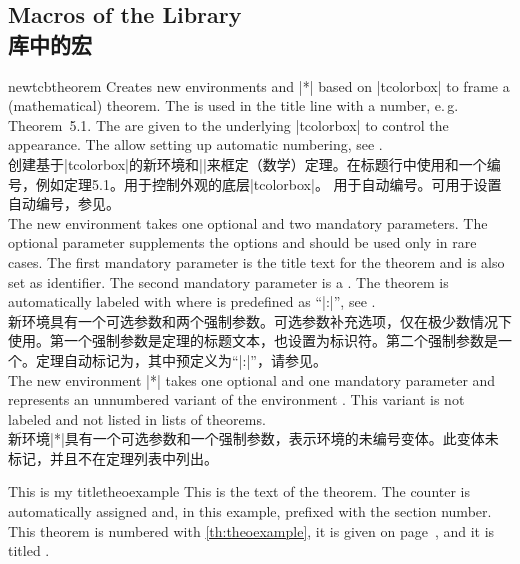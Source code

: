 
\subsection{Macros of the Library\\库中的宏}

\begin{docCommand}[doc updated=2016-06-22]{newtcbtheorem}{}
Creates new environments  and |*| based on |tcolorbox| to frame a
(mathematical) theorem. The  is used in the title line
with a number, e.\,g. \mbox{\flqq Theorem 5.1\frqq}.
The  are given to the underlying |tcolorbox| to control
the appearance.
The  allow setting up automatic numbering,
see .\\
创建基于|tcolorbox|的新环境和||来框定（数学）定理。在标题行中使用和一个编号，例如\mbox{\flqq 定理5.1\frqq}。用于控制外观的底层|tcolorbox|。 用于自动编号。可用于设置自动编号，参见。\\[0.5em]
The new environment  takes one optional and two mandatory
parameters. The optional parameter supplements the options and should be
used only in rare cases.
The first mandatory parameter is the title text for the theorem and
is also set as  identifier.
The second mandatory parameter is a . The theorem is
automatically labeled with 
where  is predefined as \enquote{|:|}, see .\\
新环境具有一个可选参数和两个强制参数。可选参数补充选项，仅在极少数情况下使用。第一个强制参数是定理的标题文本，也设置为标识符。第二个强制参数是一个。定理自动标记为，其中预定义为\enquote{|:|}，请参见。\\[0.5em]
The new environment |*| takes one optional and one mandatory
parameter and represents an unnumbered variant of the environment .
This variant is not labeled and not listed in lists of theorems.\\
新环境|*|具有一个可选参数和一个强制参数，表示环境的未编号变体。此变体未标记，并且不在定理列表中列出。
\enlargethispage*{20mm}
\begin{dispExample}
\begin{mytheo}{This is my title}{theoexample}
This is the text of the theorem. The counter is automatically assigned and,
in this example, prefixed with the section number. This theorem is numbered with
\ref{th:theoexample}, it is given on page~\pageref{th:theoexample},
and it is titled \flqq{}\frqq.


\end{mytheo}
\end{dispExample}
\end{docCommand}
